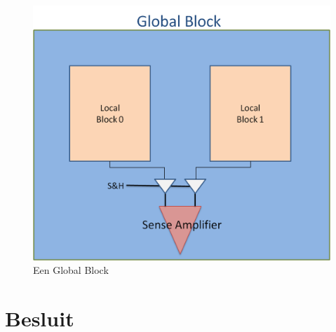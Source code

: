 \begin{figure}
  \centering
  \includegraphics[scale=0.3]{../fig/hfdstk-architecture-globalblock.png}
  \caption{Een Global Block}
  \label{fig:GB}
\end{figure}

\section{Besluit}


